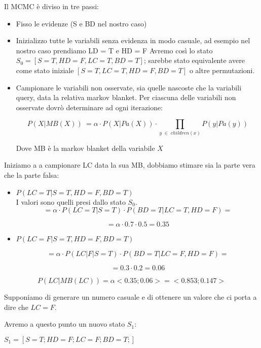 \documentclass{article}
\begin{document}
Il MCMC è diviso in tre passi:

\begin{itemize}
	\item Fisso le evidenze (S e BD nel nostro caso)
	\item Inizializzo tutte le variabili senza evidenza in modo casuale, ad esempio nel nostro caso prendiamo LD = T e HD = F
	Avremo così lo stato $S_0 = [ S= T, HD = F, LC = T, BD = T]$; sarebbe stato equivalente avere come stato iniziale  $[ S= T,LC = T, HD = F, BD = T]$ o altre permutazioni.
	
	\item Campionare le variabili non osservate, sia quelle nascoste che la variabili query, data la relativa markov blanket. Per ciascuna delle variabili non osservate dovrò determinare ad ogni iterazione:
	
	\[ P(X | MB(X))\ = \alpha \cdot P(X | Pa(X)) \cdot  
	\prod_{y \; \in \; children(x)} P(y | Pa(y)) \] 
	
	Dove MB è la markov blanket della variabile \(X\)
		
\end{itemize}

Iniziamo a  a campionare LC data la sua MB, dobbiamo stimare sia la parte vera che la parte falsa:

\begin{itemize}
	\item \(P(LC = T | S = T, HD = F, BD = T)\) 
	\\
	I valori sono quelli presi dallo stato $S_0$.
	\[
	 = \alpha \cdot P(LC = T | S = T) \cdot P(BD = T | LC = T, HD = F) = 
	\]
	
	\[
	 = \alpha \cdot 0.7 \cdot 0.5 = 0.35
	\]
	
	\item \(P(LC = F | S = T, HD = F, BD = T)\) 
	
	\[
	 = \alpha \cdot P(LC | F | S = T) \cdot P(BD = T | LC = F, HD = F) = 
	\]
	
	\[
	= 0.3 \cdot 0.2 = 0.06
	\]
	
\end{itemize}

\pagebreak

\[
P(LC | MB(LC)) = \alpha < 0.35; 0.06> = <0.853; 0.147>
\]

Supponiamo di generare un numero casuale e di ottenere un valore che ci porta a dire che \(LC = F\).

Avremo a questo punto un nuovo stato $S_1$:

$S_1 = [S = T; HD = F; LC = F; BD = T;]$
\end{document}
